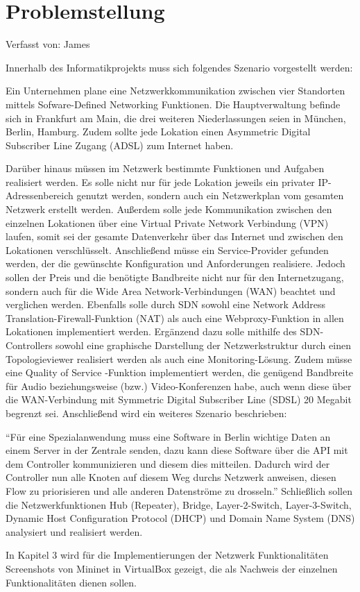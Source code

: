 \documentclass[fontsize=12pt,paper=a4,open=any,parskip=half,
  twoside=false,toc=listof,toc=bibliography,fleqn,leqno,
  captions=nooneline,captions=tableabove,british]{scrbook}
\begin{document}
\section{Problemstellung}
{\tiny Verfasst von: James\par}
Innerhalb des Informatikprojekts muss sich folgendes Szenario vorgestellt werden:\par
Ein Unternehmen plane eine Netzwerkkommunikation zwischen vier Standorten mittels Sofware-Defined Networking Funktionen. Die Hauptverwaltung befinde sich in Frankfurt am Main, die drei weiteren Niederlassungen seien in München, Berlin, Hamburg. Zudem sollte jede Lokation einen Asymmetric Digital Subscriber Line Zugang (ADSL) zum Internet haben.\par
Darüber hinaus müssen im Netzwerk bestimmte Funktionen und Aufgaben realisiert werden. Es solle nicht nur für jede Lokation jeweils ein privater IP-Adressenbereich genutzt werden, sondern auch ein Netzwerkplan vom gesamten Netzwerk erstellt werden. Außerdem solle jede Kommunikation zwischen den einzelnen Lokationen über eine Virtual Private Network Verbindung (VPN) laufen, somit sei der gesamte Datenverkehr über das Internet und zwischen den Lokationen verschlüsselt. Anschließend müsse ein Service-Provider gefunden werden, der die gewünschte Konfiguration und Anforderungen realisiere. Jedoch sollen der Preis und die benötigte Bandbreite nicht nur für den Internetzugang, sondern auch für die Wide Area Network-Verbindungen (WAN) beachtet und verglichen werden. Ebenfalls solle durch SDN sowohl eine Network Address Translation-Firewall-Funktion (NAT) als auch eine Webproxy-Funktion in allen Lokationen implementiert werden. Ergänzend dazu solle mithilfe des SDN-Controllers sowohl eine graphische Darstellung der Netzwerkstruktur durch einen Topologieviewer realisiert werden als auch eine Monitoring-Lösung. Zudem müsse eine Quality of Service -Funktion implementiert werden, die genügend Bandbreite für Audio beziehungsweise (bzw.) Video-Konferenzen habe, auch wenn diese über die WAN-Verbindung mit Symmetric Digital Subscriber Line (SDSL) 20 Megabit begrenzt sei. Anschließend wird ein weiteres Szenario beschrieben:\par
“Für eine Spezialanwendung muss eine Software in Berlin wichtige Daten an einem Server in der Zentrale senden, dazu kann diese Software über die API mit dem Controller kommunizieren und diesem dies mitteilen. Dadurch wird der Controller nun alle Knoten auf diesem Weg durchs Netzwerk anweisen, diesen Flow zu priorisieren und alle anderen Datenströme zu drosseln.” 
Schließlich sollen die Netzwerkfunktionen Hub (Repeater), Bridge, Layer-2-Switch, Layer-3-Switch, Dynamic Host Configuration Protocol (DHCP) und Domain Name System (DNS) analysiert und realisiert werden.\par
In Kapitel 3 wird für die Implementierungen der Netzwerk Funktionalitäten Screenshots von Mininet in VirtualBox gezeigt, die als Nachweis der einzelnen Funktionalitäten dienen sollen.
\end{document}
